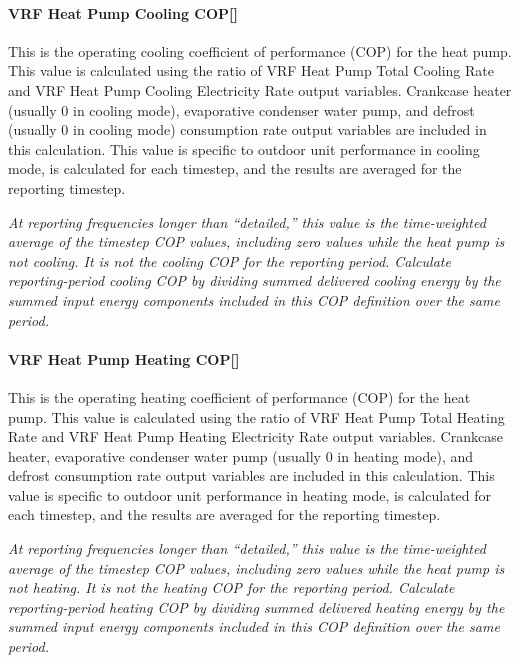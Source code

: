 \paragraph{\texorpdfstring{VRF Heat Pump Cooling COP{[]}}{VRF Heat Pump Cooling COP}}\label{vrf-heat-pump-cooling-cop}

This is the operating cooling coefficient of performance (COP) for the heat pump. This value is calculated using the ratio of VRF Heat Pump Total Cooling Rate and VRF Heat Pump Cooling Electricity Rate output variables. Crankcase heater (usually 0 in cooling mode), evaporative condenser water pump, and defrost (usually 0 in cooling mode) consumption rate output variables are included in this calculation. This value is specific to outdoor unit performance in cooling mode, is calculated for each timestep, and the results are averaged for the reporting timestep.

\emph{At reporting frequencies longer than ``detailed,'' this value is the time-weighted average of the timestep COP values, including zero values while the heat pump is not cooling. It is not the cooling COP for the reporting period. Calculate reporting-period cooling COP by dividing summed delivered cooling energy by the summed input energy components included in this COP definition over the same period.}

\paragraph{\texorpdfstring{VRF Heat Pump Heating COP{[]}}{VRF Heat Pump Heating COP}}\label{vrf-heat-pump-heating-cop}

This is the operating heating coefficient of performance (COP) for the heat pump. This value is calculated using the ratio of VRF Heat Pump Total Heating Rate and VRF Heat Pump Heating Electricity Rate output variables. Crankcase heater, evaporative condenser water pump (usually 0 in heating mode), and defrost consumption rate output variables are included in this calculation. This value is specific to outdoor unit performance in heating mode, is calculated for each timestep, and the results are averaged for the reporting timestep.

\emph{At reporting frequencies longer than ``detailed,'' this value is the time-weighted average of the timestep COP values, including zero values while the heat pump is not heating. It is not the heating COP for the reporting period. Calculate reporting-period heating COP by dividing summed delivered heating energy by the summed input energy components included in this COP definition over the same period.}

